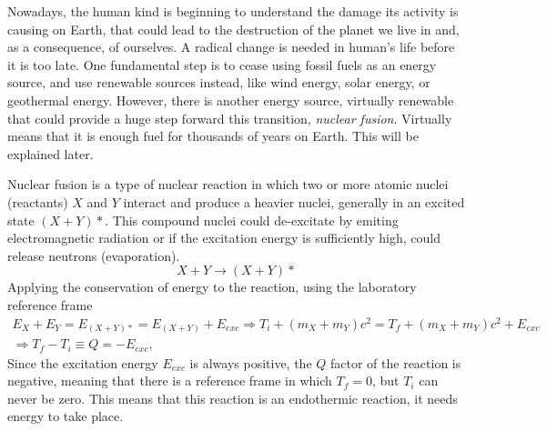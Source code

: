 \documentclass[a4paper,12pt,oneside]{book}
\begin{document}
Nowadays, the human kind is beginning to understand the damage its activity is causing on Earth, that could lead to the destruction of the planet we live in and, as a consequence, of ourselves. A radical change is needed in human's life before it is too late. One fundamental step is to cease using fossil fuels as an energy source, and  use renewable sources instead, like wind energy, solar energy, or geothermal energy. However, there is another energy source, virtually renewable that could provide a huge step forward this transition,  \textit{nuclear fusion}. Virtually means that it is enough fuel for thousands of years on Earth. This will be explained later.

Nuclear fusion is a type of nuclear reaction in which two or more atomic nuclei (reactants) $X$ and $Y$ interact and produce a heavier nuclei, generally in an excited state $(X+Y)*$. This compound nuclei could de-excitate by emiting electromagnetic radiation or if the excitation energy is sufficiently high, could release neutrons (evaporation).
%
\begin{equation}
X+Y \rightarrow (X+Y)*
\end{equation}
%
Applying the conservation of energy to the reaction, using the laboratory reference frame
%
\begin{equation}
	\left.
	\begin{array}{c}
E_X+E_Y=E_{(X+Y)*}=E_{(X+Y)}+E_{exc} \Rightarrow T_i+(m_X+m_Y)c^2=T_f+(m_X+m_Y)c^2 +E_{exc} \\ 
\Rightarrow T_f-T_i \equiv Q =-E_{exc},
\end{array}
\right.
\end{equation}
Since the excitation energy $E_{exc}$ is always positive, the $Q$ factor of the reaction is negative, meaning that there is a reference frame in which $T_f=0$, but $T_i$ can never be zero. This means that this reaction is an endothermic reaction, it needs energy to take place.
\end{document}
